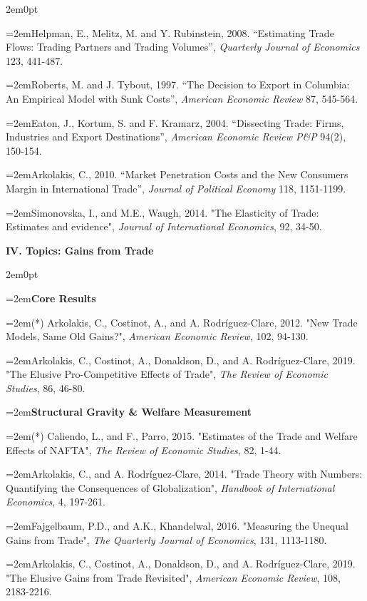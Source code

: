 \documentclass[10pt]{article}
\newcommand{\reading}{\par\hangindent=2em\hangafter=1\noindent}
\newenvironment{readingsblock}{%
  \begin{adjustwidth}{2em}{0pt} %
}{%
  \end{adjustwidth}
}
\begin{document}
\begin{readingsblock}
  \reading Helpman, E., Melitz, M. and Y. Rubinstein, 2008. “Estimating Trade Flows: Trading Partners and Trading Volumes”, {\it Quarterly Journal of Economics} 123, 441-487.
  \reading Roberts, M. and J. Tybout, 1997. “The Decision to Export in Columbia: An Empirical Model with Sunk Costs”, {\it American Economic Review} 87, 545-564.
  \reading Eaton, J., Kortum, S. and F. Kramarz, 2004. “Dissecting Trade: Firms, Industries and Export Destinations”, {\it American Economic Review P\&P}  94(2), 150-154.
  \reading Arkolakis, C., 2010. “Market Penetration Costs and the New Consumers Margin in International Trade”, {\it Journal of Political Economy} 118, 1151-1199. 
  \reading Simonovska, I., and M.E., Waugh, 2014. "The Elasticity of Trade: Estimates and evidence", {\it Journal of International Economics}, 92, 34-50.\\[4pt]
  
  \end{readingsblock}
  
\noindent \textbf{IV. Topics: Gains from Trade} \\[6pt]

  \begin{readingsblock}

  \reading \textbf{Core Results} \\[4pt]
  
  \reading (*) Arkolakis, C., Costinot, A., and A. Rodríguez-Clare, 2012. "New Trade Models, Same Old Gains?", {\it American Economic Review}, 102, 94-130.
  \reading Arkolakis, C., Costinot, A., Donaldson, D., and A. Rodríguez-Clare, 2019. "The Elusive Pro-Competitive Effects of Trade", {\it The Review of Economic Studies}, 86, 46-80.

  
  \reading \textbf{Structural Gravity \& Welfare Measurement} \\[4pt]
  
  \reading (*) Caliendo, L., and F., Parro, 2015. "Estimates of the Trade and Welfare Effects of NAFTA", {\it The Review of Economic Studies}, 82, 1-44. 
  \reading Arkolakis, C., and A. Rodríguez-Clare, 2014. "Trade Theory with Numbers: Quantifying the Consequences of Globalization", {\it Handbook of International Economics}, 4, 197-261.
  \reading Fajgelbaum, P.D., and A.K., Khandelwal, 2016. "Measuring the Unequal Gains from Trade", {\it The Quarterly Journal of Economics}, 131, 1113-1180. 
  \reading Arkolakis, C., Costinot, A., Donaldson, D., and A. Rodríguez-Clare, 2019. "The Elusive Gains from Trade Revisited", {\it American Economic Review}, 108, 2183-2216. \\[4pt]
  
  \end{readingsblock}
  
\end{document}
